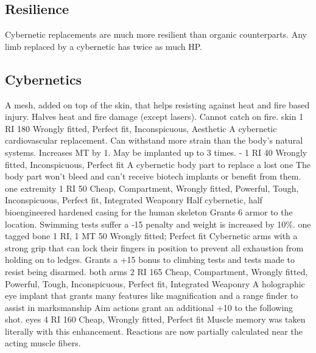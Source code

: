 	\subsection{Resilience}
	Cybernetic replacements are much more resilient than organic counterparts.
	Any limb replaced by a cybernetic has twice as much HP.
\subsection{Cybernetics}
\vspace{10mm}
\begin{multicols}{2}
    {A mesh, added on top of the skin, that helps resisting against heat and fire based injury.}
    {Halves heat and fire damage (except lasers). Cannot catch on fire.}
    {skin}
    {1 RI}
    {180}
    {Wrongly fitted, Perfect fit, Inconspicuous, Aesthetic}
    {A cybernetic cardiovascular replacement. Can withstand more strain than the body's natural systems.}
    {Increases MT by 1. May be implanted up to 3 times.}
    {-}
    {1 RI}
    {40}
    {Wrongly fitted, Inconspicuous, Perfect fit}
    {A cybernetic body part to replace a lost one}
    {The body part won't bleed and can't receive biotech implants or benefit from them.}
    {one extremity}
    {1 RI}
    {50}
    {Cheap, Compartment, Wrongly fitted, Powerful, Tough, Inconspicuous, Perfect fit, Integrated Weaponry}
    {Half cybernetic, half bioengineered hardened casing for the human skeleton}
    {Grants 6 armor to the location. Swimming tests suffer a -15 penalty and weight is increased by 10\%.}
    {one tagged bone}
    {1 RI, 1 MT}
    {50}
    {Wrongly fitted; Perfect fit}
    {Cybernetic arms with a strong grip that can lock their fingers in position to prevent all exhaustion from holding on to ledges.}
    {Grants a +15 bonus to climbing tests and tests made to resist being disarmed.}
    {both arms}
    {2 RI}
    {165}
    {Cheap, Compartment, Wrongly fitted, Powerful, Tough, Inconspicuous, Perfect fit, Integrated Weaponry}
    {A holographic eye implant that grants many features like magnification and a range finder to assist in marksmanship}
    {Aim actions grant an additional +10 to the following shot.}
    {eyes}
    {4 RI}
    {160}
    {Cheap, Wrongly fitted, Perfect fit}
    {Muscle memory was taken literally with this enhancement. Reactions are now partially calculated near the acting muscle fibers.}

\end{multicols}
